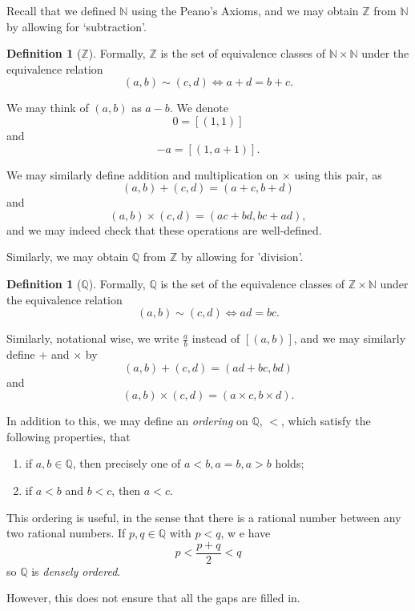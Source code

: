 \documentclass{article}
\theoremstyle{definition}
\newtheorem{definition}[theorem]{Definition}
\theoremstyle{remark}
\newcommand{\pqty}[1]{\left(#1\right)}
\newcommand{\bqty}[1]{\left[#1\right]}
\newcommand{\NN}{\mathbb{N}}
\newcommand{\ZZ}{\mathbb{Z}}
\newcommand{\QQ}{\mathbb{Q}}
\begin{document}
Recall that we defined \(\NN\) using the Peano's Axioms, and we may obtain \(\ZZ\) from \(\NN\) by allowing for `subtraction'.

\begin{definition}[\(\ZZ\)]
    Formally, \(\ZZ\) is the set of equivalence classes of \(\NN \times \NN\) under the equivalence relation
    \[
        \pqty{a, b} \sim \pqty{c, d} \iff a + d = b + c.
    \]
\end{definition}

We may think of \(\pqty{a, b}\) as \(a - b\). We denote
\[
    0 = \bqty{\pqty{1, 1}}
\]
and
\[
    -a = \bqty{\pqty{1, a + 1}}.
\]

We may similarly define addition and multiplication on \(\times\) using this pair, as
\[
    \pqty{a, b} + \pqty{c, d} = \pqty{a + c, b + d}
\]
and
\[
    \pqty{a, b} \times \pqty{c, d} = \pqty{ac + bd, bc + ad},
\]
and we may indeed check that these operations are well-defined.

Similarly, we may obtain \(\QQ\) from \(\ZZ\) by allowing for 'division'.

\begin{definition}[\(\QQ\)]
    Formally, \(\QQ\) is the set of the equivalence classes of \(\ZZ \times \NN\) under the equivalence relation
    \[
        \pqty{a, b} \sim \pqty{c, d} \iff ad = bc.
    \]
\end{definition}

Similarly, notational wise, we write \(\frac{a}{b}\) instead of \(\bqty{\pqty{a, b}}\), and we may similarly define \(+\) and \(\times\) by
\[
    \pqty{a, b} + \pqty{c, d} = \pqty{ad + bc, bd}
\]
and
\[
    \pqty{a, b} \times \pqty{c, d} = \pqty{a \times c, b \times d}.
\]

In addition to this, we may define an \emph{ordering} on \(\QQ\), \(<\), which satisfy the following properties, that
\begin{enumerate}
    \item if \(a, b \in \QQ\), then precisely one of \(a < b, a = b, a > b\) holds;
    \item if \(a < b\) and \(b < c\), then \(a < c\).
\end{enumerate}

This ordering is useful, in the sense that there is a rational number between any two rational numbers. If \(p, q \in \QQ\) with \(p < q\), w e have
\[
    p < \frac{p + q}{2} < q
\]
so \(\QQ\) is \emph{densely ordered}.

However, this does not ensure that all the gaps are filled in.
\end{document}
